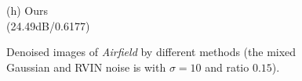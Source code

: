 \documentclass[runningheads]{llncs}
\begin{document}
\begin{figure}
{\begin{minipage}[t]{0.244\textwidth}
{\footnotesize (h) Ours \\(24.49dB/0.6177)}
\end{minipage}
}
\caption{Denoised images of \textsl{Airfield} by different methods (the mixed Gaussian and RVIN noise is with $\sigma = 10$ and ratio $0.15$).}
\label{fig9}
\end{figure}

\begin{figure}
\centering
{}
\end{figure}
\end{document}
